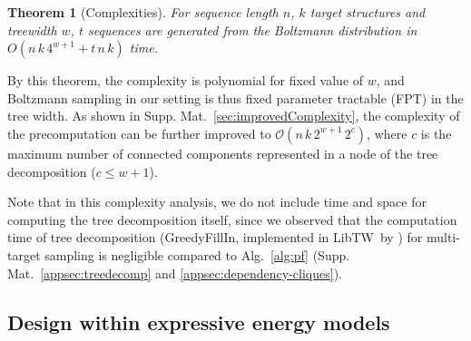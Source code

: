 \documentclass[]{bmcart}
\newtheorem{theorem}{Theorem}
\newcommand{\Software}[1]{{\ttfamily #1}}
\newcommand{\citet}[1]{\cite{#1}}
\begin{document}


\begin{theorem}[Complexities]\label{th:complexities}
  For sequence length $n$, $k$ target structures and treewidth $w$,
  $t$ sequences
  are generated from the Boltzmann distribution  in
  $O( n\, k \, 4^{w+1} + t\, n\, k )$ time.
\end{theorem}

By this theorem, the complexity is polynomial for fixed value of $w$, and Boltzmann sampling in our setting is thus fixed parameter tractable (FPT) in the tree width.
%
As shown in Supp. Mat.~\ref{sec:improvedComplexity}, the complexity of the precomputation can be further improved to
$\mathcal{O}(n\,k\,2^{w+1}\,2^{c})$, where $c$ is the maximum number of connected components represented in a node of the tree decomposition ($c\le w+1$).


Note that in this complexity analysis, we do not include time and space for computing the
tree decomposition itself, since we observed that the computation time
of tree decomposition (\Software{GreedyFillIn}, implemented in
\Software{LibTW}~by \citet{Dijk2006}) for multi-target sampling is
negligible compared to Alg.~\ref{alg:pf}
(Supp. Mat.~\ref{appsec:treedecomp} and
\ref{appsec:dependency-cliques}).

\subsection*{Design within expressive energy models}\label{sec:energy_models}

\end{document}
